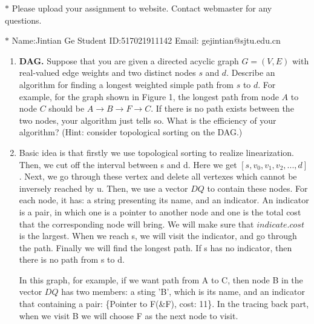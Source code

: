 \documentclass[12pt,a4paper]{article}
\makeatletter
\newtheorem*{solution}{Solution}
\theoremstyle{definition}
\renewenvironment{solution}[1][Solution] {\par\pushQED{\qed}\normalfont\topsep6\p@\@plus6\p@\relax\trivlist\item[\hskip\labelsep\bfseries#1\@addpunct{.}]\ignorespaces}{\popQED\endtrivlist\@endpefalse} \makeatother
\makeatother
\begin{document}
\noindent

\noindent{}
\begin{center}
\footnotesize{\color{red}$*$ Please upload your assignment to website. Contact webmaster for any questions.}

\footnotesize{\color{blue}$*$ Name:Jintian Ge  \quad Student ID:517021911142 \quad Email: gejintian@sjtu.edu.cn}
\end{center}


\begin{enumerate}

\item \textbf{DAG.} Suppose that you are given a directed acyclic graph $G=(V,E)$ with real-valued edge weights and two distinct nodes $s$ and $d$. Describe an algorithm for finding a longest weighted simple path from $s$ to $d$. For example, for the graph shown in Figure 1, the longest path from node $A$ to node $C$ should be $A \rightarrow B \rightarrow F \rightarrow C$. If there is no path exists between the two nodes, your algorithm just tells so. What is the efficiency of your algorithm? (Hint: consider topological sorting on the DAG.)

\begin{solution}
Basic idea is that firstly we use topological sorting to realize linearization. Then, we cut off the interval between s and d. Here we get $[s,v_0,v_1,v_2,...,d]$. Next, we go through these vertex and delete all vertexes which cannot be inversely reached by u. Then, we use a vector $DQ$ to contain these nodes. For each node, it has: a string presenting its name, and an indicator. An indicator is a pair, in which one is a pointer to another node and one is the total cost that the corresponding node will bring. We will make sure that $indicate.cost$ is the largest. When we reach s, we will visit the indicator, and go through the path. Finally we will find the longest path. If s has no indicator, then there is no path from s to d.

In this graph, for example, if we want path from A to C, then node B in the vector $DQ$ has two members: a sting 'B', which is its name, and an indicator that containing a pair: \{Pointer to F(\&F), cost: 11\}. In the tracing back part, when we visit B we will choose F as the next node to visit.


\end{solution}
\end{enumerate}
\end{document}
